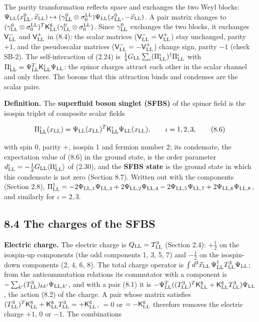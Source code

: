 \documentclass[
  10pt,
]{article}
\begin{document}
The parity transformation reflects space and exchanges the two Weyl
blocks:
\(\Psi_{\rm LL}(x^0_{\rm LL},\vec x_{\rm LL})\mapsto(\gamma^0_{\rm LL}\otimes\sigma^{\rm LL}_0)\Psi_{\rm LL}(x^0_{\rm LL},-\vec x_{\rm LL})\).
A pair matrix changes to
\((\gamma^0_{\rm LL}\otimes\sigma^{\rm LL}_0)^T\mathsf K^{\rm g}_{\rm LL}(\gamma^0_{\rm LL}\otimes\sigma^{\rm LL}_0)\).
Since \(\gamma^0_{\rm LL}\) exchanges the two blocks, it exchanges
\(\mathsf V^-_{\rm LL}\) and \(\mathsf V^+_{\rm LL}\) in (8.4): the
scalar matrices (\(\mathsf V^-_{\rm LL}=\mathsf V^+_{\rm LL}\)) stay
unchanged, parity \(+1\), and the pseudoscalar matrices
(\(\mathsf V^-_{\rm LL}=-\mathsf V^+_{\rm LL}\)) change sign, parity
\(-1\) (check SB-2). The self-interaction of (2.24) is
\(\tfrac14G_{\rm LL}\sum_\iota(\Pi^\iota_{\rm LL})^\dagger\Pi^\iota_{\rm LL}\)
with
\(\Pi^\iota_{\rm LL}=\Psi^T_{\rm LL}\mathsf K^\iota_{\rm LL}\Psi_{\rm LL}\):
the spinor charges attract each other in the scalar channel and only
there. The bosons that this attraction binds and condenses are the
scalar pairs.

\textbf{Definition.} The \textbf{superfluid boson singlet (SFBS)} of the
spinor field is the isospin triplet of composite scalar fields

\[\Pi^\iota_{\rm LL}(x_{\rm LL})=\Psi_{\rm LL}(x_{\rm LL})^T\mathsf K^\iota_{\rm LL}\Psi_{\rm LL}(x_{\rm LL}),\qquad\iota=1,2,3,\tag{8.6}\]

with spin 0, parity \(+\), isospin 1 and fermion number 2; its
condensate, the expectation value of (8.6) in the ground state, is the
order parameter
\(d^\iota_{\rm LL}=-\tfrac12G_{\rm LL}\langle\Pi^\iota_{\rm LL}\rangle\)
of (2.30), and the \textbf{SFBS state} is the ground state in which this
condensate is not zero (Section 8.7). Written out with the components
(Section 2.8),
\(\Pi^1_{\rm LL}=-2\Psi_{{\rm LL},1}\Psi_{{\rm LL},3}+2\Psi_{{\rm LL},2}\Psi_{{\rm LL},4}-2\Psi_{{\rm LL},5}\Psi_{{\rm LL},7}+2\Psi_{{\rm LL},6}\Psi_{{\rm LL},8}\),
and similarly for \(\iota=2,3\).

\hypertarget{the-charges-of-the-sfbs}{%
\subsection{8.4 The charges of the SFBS}\label{the-charges-of-the-sfbs}}

\textbf{Electric charge.} The electric charge is
\(Q_{\rm LL}=T^3_{\rm LL}\) (Section 2.4): \(+\tfrac12\) on the
isospin-up components (the odd components 1, 3, 5, 7) and \(-\tfrac12\)
on the isospin-down components (2, 4, 6, 8). The total charge operator
is
\(\int d^3\vec x_{\rm LL}\,\Psi^\dagger_{\rm LL}T^3_{\rm LL}\Psi_{\rm LL}\);
from the anticommutation relations its commutator with a component is
\(-\sum_{k'}(T^3_{\rm LL})_{kk'}\Psi_{{\rm LL},k'}\), and with a pair
(8.1) it is
\(-\Psi^T_{\rm LL}((T^3_{\rm LL})^T\mathsf K^{\rm g}_{\rm LL}+\mathsf K^{\rm g}_{\rm LL}T^3_{\rm LL})\Psi_{\rm LL}\),
the action (8.2) of the charge. A pair whose matrix satisfies
\((T^3_{\rm LL})^T\mathsf K^{\rm g}_{\rm LL}+\mathsf K^{\rm g}_{\rm LL}T^3_{\rm LL}=+\mathsf K^{\rm g}_{\rm LL}\),
\(=0\) or \(=-\mathsf K^{\rm g}_{\rm LL}\) therefore removes the
electric charge \(+1\), \(0\) or \(-1\). The combinations
\end{document}
